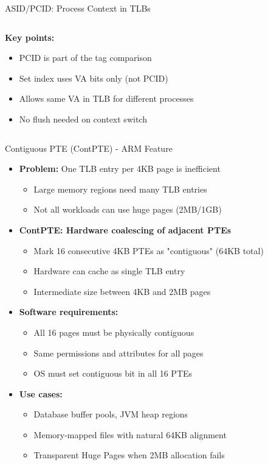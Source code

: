 \documentclass[aspectratio=169,12pt]{beamer}
\begin{document}
\begin{frame}{ASID/PCID: Process Context in TLBs}
\begin{columns}[T]
\begin{column}{0.52\textwidth}
\begin{center}
\end{center}

\textbf{Key points:}
\begin{itemize}
\item PCID is part of the tag comparison
\item Set index uses VA bits only (not PCID)
\item Allows same VA in TLB for different processes
\item No flush needed on context switch
\end{itemize}
\end{column}
\end{columns}
\end{frame}

\begin{frame}{Contiguous PTE (ContPTE) - ARM Feature}
\begin{itemize}
\item \textbf{Problem:} One TLB entry per 4KB page is inefficient
    \begin{itemize}
    \item Large memory regions need many TLB entries
    \item Not all workloads can use huge pages (2MB/1GB)
    \end{itemize}
\item \textbf{ContPTE: Hardware coalescing of adjacent PTEs}
    \begin{itemize}
    \item Mark 16 consecutive 4KB PTEs as "contiguous" (64KB total)
    \item Hardware can cache as single TLB entry
    \item Intermediate size between 4KB and 2MB pages
    \end{itemize}
\item \textbf{Software requirements:}
    \begin{itemize}
    \item All 16 pages must be physically contiguous
    \item Same permissions and attributes for all pages
    \item OS must set contiguous bit in all 16 PTEs
    \end{itemize}
\item \textbf{Use cases:}
    \begin{itemize}
    \item Database buffer pools, JVM heap regions
    \item Memory-mapped files with natural 64KB alignment
    \item Transparent Huge Pages when 2MB allocation fails
    \end{itemize}
\end{itemize}
\end{frame}
\end{document}
